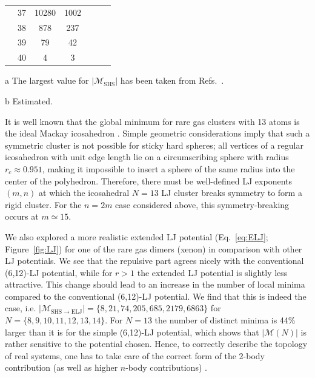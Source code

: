 \begin{table}
{\begin{threeparttable}
{\begin{tabular}{clccccc}
   & 37  & 10280  				& 1002 &                       &                       &                     \\
   & 38  & 878    				& 237  &                       &                       &                     \\
   & 39  & 79     				& 42   &                       &                       &                     \\
   & 40  & 4      				& 3    &                       &                       &                     \\\bottomrule
    \end{tabular}}
        \begin{tablenotes}
        \item[a]{The largest value for $|\mathcal{M}_\mathrm{SHS}|$ has been taken from 
    Refs.~\cite{Holmes-Cerfon_EnumeratingRigidSphere_2016,Hoy_Structurefinitesphere_2012,Hoy_Structuredynamicsmodel_2015}.}
        \item[b]{Estimated.}
        \end{tablenotes}
    \end{threeparttable}}
\end{table}%


It is well known that the global minimum for rare gas clusters with 13 atoms is
the ideal Mackay icosahedron \autocite{Hoare_Physicalclustermechanics_1975,Hoare_Statisticalmechanicsmorphology_1976,Hoare_StructureDynamicsSimple_2007}. Simple
geometric considerations imply that such a symmetric cluster is not possible
for sticky hard spheres; all vertices of a regular icosahedron with unit edge length
lie on a circumscribing sphere with radius $r_c\approx 0.951$, making it
impossible to insert a sphere of the same radius into the center of the
polyhedron.  Therefore, there must be well-defined LJ exponents $(m,n)$ at
which the icosahedral $N = 13$ LJ cluster breaks symmetry to form a rigid cluster.  
For the $n = 2m$ case considered above, this symmetry-breaking occurs at $m \simeq 15$.

We also explored a more realistic extended LJ potential (Eq.\ \ref{eq:ELJ};  Figure~\ref{fig:LJ})
for one of the rare gas dimers (xenon) 
in comparison with other LJ potentials. We see that the repulsive part agrees
nicely with the conventional (6,12)-LJ potential, while for $r > 1$
the extended LJ potential is slightly less attractive. 
This change should lead to an increase in the number of local minima compared to the conventional
(6,12)-LJ potential. We find that this is indeed the case, i.e.
$|\mathcal{M}_\mathrm{SHS\to ELJ}|=\{8,21,74,205,685,2179,6863\}$ for
$N=\{8,9,10,11,12,13,14\}$.  For $N=13$ the number of distinct minima is 44\% larger than it is for the simple (6,12)-LJ potential,
which shows that $|\mathcal{M}(N)|$ is rather sensitive to the potential chosen.
Hence, to correctly describe the topology of real systems, one has to take care
of the correct form of the 2-body contribution (as well as higher $n$-body
contributions) \autocite{Schwerdtfeger-2016}.



